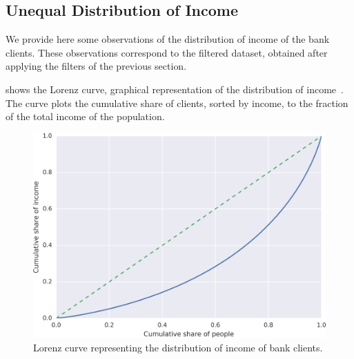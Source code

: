 % 
% 

\subsection{Unequal Distribution of Income}

We provide here some observations of the distribution of income of the bank clients. These observations correspond to the filtered dataset, obtained after applying the filters of the previous section.

 shows the Lorenz curve, graphical representation of the distribution of income~\cite{satchell1987}. The curve plots the cumulative share of clients, sorted by income, to the fraction of the total income of the population.

\begin{figure}
\centering
\includegraphics[width=0.9\columnwidth]{figures/cumulative_income.png}
\caption{Lorenz curve representing the distribution of income of bank clients.}
\label{fig:income_distribution}
\end{figure}

